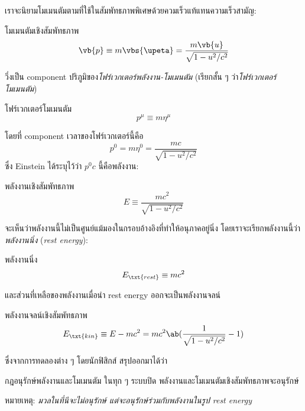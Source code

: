 เราจะนิยามโมเมนตัมตามที่ใช้ในสัมพัทธภาพพิเศษด้วยควมเร็วแท้แทนความเร็วสามัญ:
\begin{defbox}{โมเมนตัมเชิงสัมพัทธภาพ}
    \begin{equation}
        \vb{p} \equiv m\vbs{\upeta} = \frac{m\vb{u}}{\sqrt{1-u^2/c^2}}\label{relmomentum}
    \end{equation}
\end{defbox}
วึ่งเป็น component ปริภูมิของ\emph{โฟร์เวกเตอร์พลังงาน-โมเมนตัม} (เรียกสั้น ๆ ว่า\emph{โฟร์เวกเตอร์โมเมนตัม})
\begin{defbox}{โฟร์เวกเตอร์โมเมนตัม}
    \begin{equation}
        p^\mu \equiv m\eta^\mu
    \end{equation}
\end{defbox}
โดยที่ component เวลาของโฟร์เวกเตอร์นี้คือ
\begin{equation}
    p^0 = m\eta^0 = \frac{mc}{\sqrt{1 - u^2/c^2}}
\end{equation}
ซึ่ง Einstein ได้ระบุไว้ว่า $p^0 c$ นี้คือพลังงาน:
\begin{defbox}{พลังงานเชิงสัมพัทธภาพ}
    \begin{equation}
        E \equiv \frac{mc^2}{\sqrt{1 - u^2/c^2}}\label{relenergy}
    \end{equation}
\end{defbox}
จะเห็นว่าพลังงานนี้ไม่เป็นศูนย์แม้มองในกรอบอ้างอิงที่ทำให้อนุภาคอยู่นิ่ง โดยเราจะเรียกพลังงานนี้ว่า\emph{พลังงานนิ่ง} (\emph{rest energy}):
\begin{defbox}{พลังงานนิ่ง}
    \begin{equation}
        E_\txt{rest} \equiv mc^2
    \end{equation}
\end{defbox}
และส่วนที่เหลือของพลังงานเมื่อนำ rest energy ออกจะเป็นพลังงานจลน์
\begin{defbox}{พลังงานจลน์เชิงสัมพัทธภาพ}
    \begin{equation}
        E_\txt{kin} \equiv E - mc^2 = mc^2\ab(\frac{1}{\sqrt{1 - u^2/c^2}} - 1)
    \end{equation}
\end{defbox}

ซึ่งจากการทดลองต่าง ๆ โดยนักฟิสิกส์ สรุปออกมาได้ว่า
\begin{lawbox}{กฎอนุรักษ์พลังงานและโมเมนตัม}
    ในทุก ๆ ระบบปิด พลังงานและโมเมนตัมเชิงสัมพัทธภาพจะอนุรักษ์
\end{lawbox}
หมายเหตุ: \emph{มวลในที่นีจะไม่อนุรักษ์ แต่จะอนุรักษ์ร่วมกับพลังงานในรูป rest energy}


